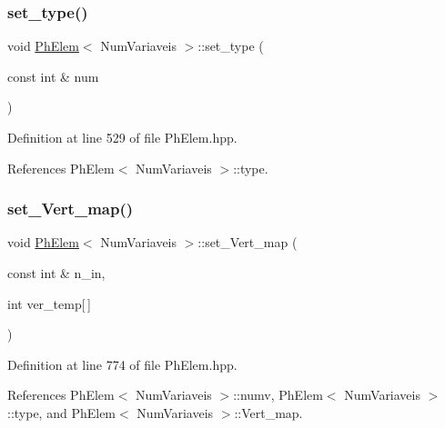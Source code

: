 \subsubsection{\texorpdfstring{set\+\_\+type()}{set\_type()}}
{\footnotesize\ttfamily void \hyperlink{classPhElem}{Ph\+Elem}$<$ Num\+Variaveis $>$\+::set\+\_\+type (\begin{DoxyParamCaption}\item[{const int \&}]{num }\end{DoxyParamCaption})\hspace{0.3cm}{\ttfamily [inherited]}}



Definition at line 529 of file Ph\+Elem.\+hpp.



References Ph\+Elem$<$ Num\+Variaveis $>$\+::type.

\mbox{\label{classPhElem_a134cbfd28fc238a24156ab1c24fc31c0}} 
\subsubsection{\texorpdfstring{set\+\_\+\+Vert\+\_\+map()}{set\_Vert\_map()}}
{\footnotesize\ttfamily void \hyperlink{classPhElem}{Ph\+Elem}$<$ Num\+Variaveis $>$\+::set\+\_\+\+Vert\+\_\+map (\begin{DoxyParamCaption}\item[{const int \&}]{n\+\_\+in,  }\item[{int}]{ver\+\_\+temp\mbox{[}$\,$\mbox{]} }\end{DoxyParamCaption})\hspace{0.3cm}{\ttfamily [inherited]}}



Definition at line 774 of file Ph\+Elem.\+hpp.



References Ph\+Elem$<$ Num\+Variaveis $>$\+::numv, Ph\+Elem$<$ Num\+Variaveis $>$\+::type, and Ph\+Elem$<$ Num\+Variaveis $>$\+::\+Vert\+\_\+map.

\mbox{\label{classPhElem_ac6f5e03dd6e155037363dbd0ea2f401b}} 
